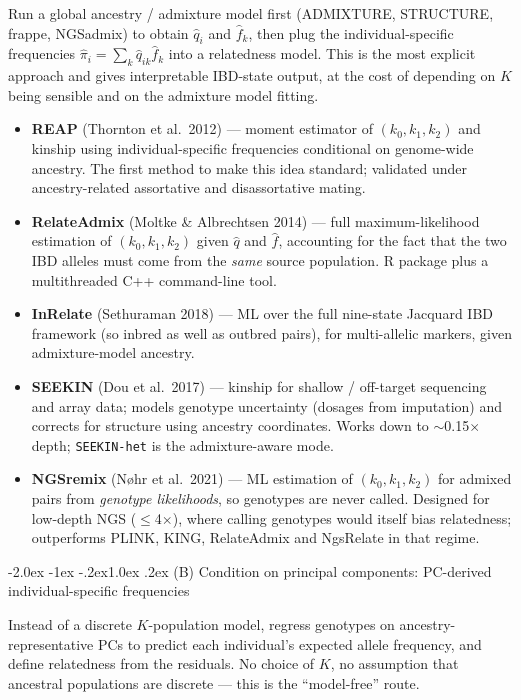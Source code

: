 \documentclass[10pt,a4paper]{article}
\makeatletter
\renewcommand\subsection{\@startsection{subsection}{2}{\z@}%
  {-2.0ex \@plus -1ex \@minus -.2ex}{1.0ex \@plus.2ex}%
  {\normalfont\normalsize\bfseries\color{hdr}}}
\newenvironment{tightitem}{%
  \begin{itemize}\setlength{\itemsep}{1pt}\setlength{\parskip}{0pt}%
  \setlength{\topsep}{3pt}\setlength{\parsep}{0pt}}{\end{itemize}}
\makeatother
\begin{document}
Run a global ancestry / admixture model first (ADMIXTURE, STRUCTURE, frappe, NGSadmix) to obtain
$\hat{q}_{i}$ and $\hat{f}_{k}$, then plug the individual-specific frequencies
$\hat{\pi}_{i}=\sum_k \hat q_{ik}\hat f_{k}$ into a relatedness model. This is the most explicit approach and
gives interpretable IBD-state output, at the cost of depending on $K$ being sensible and on the admixture
model fitting.

\begin{tightitem}
  \item \textbf{REAP} (Thornton et al.\ 2012) --- moment estimator of $(k_0,k_1,k_2)$ and kinship using
  individual-specific frequencies conditional on genome-wide ancestry. The first method to make this idea
  standard; validated under ancestry-related assortative and disassortative mating.
  \item \textbf{RelateAdmix} (Moltke \& Albrechtsen 2014) --- full maximum-likelihood estimation of
  $(k_0,k_1,k_2)$ given $\hat q$ and $\hat f$, accounting for the fact that the two IBD alleles must come
  from the \emph{same} source population. R package plus a multithreaded C++ command-line tool.
  \item \textbf{InRelate} (Sethuraman 2018) --- ML over the full nine-state Jacquard IBD framework
  (so inbred as well as outbred pairs), for multi-allelic markers, given admixture-model ancestry.
  \item \textbf{SEEKIN} (Dou et al.\ 2017) --- kinship for shallow / off-target sequencing and array data;
  models genotype uncertainty (dosages from imputation) and corrects for structure using ancestry
  coordinates. Works down to $\sim$0.15$\times$ depth; \texttt{SEEKIN-het} is the admixture-aware mode.
  \item \textbf{NGSremix} (N\o hr et al.\ 2021) --- ML estimation of $(k_0,k_1,k_2)$ for admixed pairs from
  \emph{genotype likelihoods}, so genotypes are never called. Designed for low-depth NGS ($\leq$4$\times$),
  where calling genotypes would itself bias relatedness; outperforms PLINK, KING, RelateAdmix and NgsRelate
  in that regime.
\end{tightitem}

\subsection{(B) Condition on principal components: PC-derived individual-specific frequencies}

Instead of a discrete $K$-population model, regress genotypes on ancestry-representative PCs to predict
each individual's expected allele frequency, and define relatedness from the residuals. No choice of $K$,
no assumption that ancestral populations are discrete --- this is the ``model-free'' route.
\end{document}

